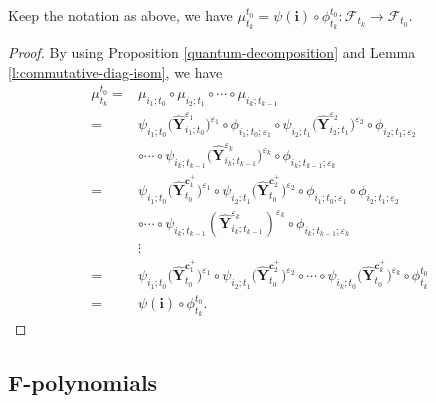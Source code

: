 \begin{Proposition}\label{long-quantum-decomposition}
 Keep the notation as above, we have
 $\mu_{t_k}^{t_0}=\psi(\mathbf{i})\circ\phi_{t_{k}}^{t_0}\colon  \mathcal{F}_{t_{k}}\to\mathcal{F}_{t_{0}}$.
\end{Proposition}
\begin{proof}
 By using Proposition \ref{quantum-decomposition} and Lemma \ref{l:commutative-diag-isom}, we have
 \begin{align*}
 \mu_{t_k}^{t_0}
 ={}&\mu_{i_1;t_0}\circ\mu_{i_2;t_1}\circ\cdots\circ\mu_{i_k;t_{k-1}}\\
 ={}&\psi_{i_{1};t_{0}}\bigl(\mathbf{\hat{Y}}_{i_{1};t_{0}}^{\varepsilon_{1}}\bigr)^{\varepsilon_{1}}\circ\phi_{i_{1};t_{0};\varepsilon_{1}}\circ\psi_{i_{2};t_{1}}
 \bigl(\mathbf{\hat{Y}}_{i_{2};t_{1}}^{\varepsilon_{2}}\bigr)^{\varepsilon_{2}}\circ\phi_{i_{2};t_{1};\varepsilon_{2}}\\
 &\circ\cdots\circ\psi_{i_{k};t_{k-1}}
 \bigl(\mathbf{\hat{Y}}_{i_{k};t_{k-1}}^{\varepsilon_{k}}\bigr)^{\varepsilon_{k}}\circ\phi_{i_{k};t_{k-1};\varepsilon_{k}}\\
 ={}&\psi_{i_{1};t_{0}}\bigl(\mathbf{\hat{Y}}_{t_{0}}^{\mathbf{c}_{1}^{+}}\bigr)^{\varepsilon_{1}}\circ\psi_{i_{2};t_{1}}\bigl(\mathbf{\hat{Y}}_{t_{0}}^{\mathbf{c}_{2}^{+}}\bigr)^{\varepsilon_{2}}\circ\phi_{i_{1};t_{0};\varepsilon_{1}}\circ\phi_{i_{2};t_{1};\varepsilon_{2}}\\
 &\circ\cdots\circ\psi_{i_{k};t_{k-1}}(\mathbf{\hat{Y}}_{i_{k};t_{k-1}}^{\varepsilon_{k}})^{\varepsilon_{k}}\circ\phi_{i_{k};t_{k-1};\varepsilon_{k}}\\
 &\vdots\\
 ={}&\psi_{i_{1};t_{0}}\bigl(\mathbf{\hat{Y}}_{t_{0}}^{\mathbf{c}_{1}^{+}}\bigr)^{\varepsilon_{1}}\circ\psi_{i_{2};t_{1}}\bigl(\mathbf{\hat{Y}}_{t_{0}}^{\mathbf{c}_{2}^{+}}\bigr)^{\varepsilon_{2}}\circ\cdots\circ\psi_{i_{k};t_{0}}
 \bigl(\mathbf{\hat{Y}}_{t_{0}}^{\mathbf{c}_{k}^{+}}\bigr)^{\varepsilon_{k}}\circ\phi_{t_{k}}^{t_0}\\
 ={}&\psi(\mathbf{i})\circ\phi_{t_{k}}^{t_0}.\tag*{\qed}
 \end{align*}\renewcommand{\qed}{}
\end{proof}

\subsection[F-polynomials]{$\boldsymbol{F}$-polynomials}\label{s:F-poly_gen_quantum_cluster_alg}

